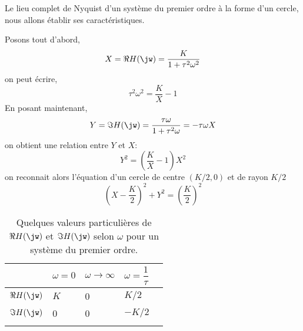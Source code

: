 Le lieu complet de Nyquist d'un système du premier ordre à la forme d'un cercle, nous allons établir
ses caractéristiques\cite{9782729860127}.

Posons tout d'abord,
$$
X=\Re{H(\jw)}=\dfrac{K}{1+\tau^2\omega^2}
$$
on peut écrire,
$$
\tau^2\omega^2=\dfrac{K}{X}-1
$$
En posant maintenant, 
$$
Y=\Im{H(\jw)}=\dfrac{\tau\omega}{1+\tau^2\omega}=-\tau\omega X
$$
on obtient une relation entre $Y$ et $X$:
$$
Y^2=\left(\dfrac{K}{X}-1\right)X^2
$$
on reconnait alors l'équation d'un cercle de centre $(K/2,0)$ et de rayon $K/2$
$$
\left(X-\dfrac{K}{2}\right)^2+Y^2=\left(\dfrac{K}{2}\right)^2
$$
\begin{table}
    \begin{center}
    \begin{tabular}{M{2.0cm}M{2.0cm}M{2.0cm}M{2.0cm}N}
        \hhline{====}
                                     & $\omega=0$  & $\omega\to\infty$    & $\omega=\dfrac{1}{\tau}$ & \\[1.5em]
        \hline
        $\Re{H(\jw)}$     & $K$         & 0                    & $K/2$                    & \\ [1.5em]
        \hline
        $\Im{H(\jw)}$     & 0           & 0                    & $-K/2$                     & \\[1.5em]
        \hhline{====}
    \end{tabular}
    \caption{Quelques valeurs particulières de $\Re{H(\jw)}$ et $\Im{H(\jw)}$
    selon $\omega$ pour un système du premier ordre\label{tab-nyquist-vp_1er}.}
    \end{center}
\end{table}

